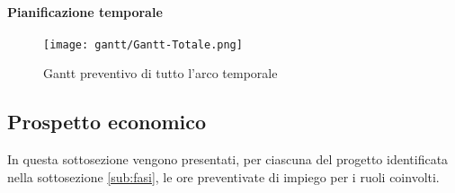 \documentclass{scalatekids-article}
\begin{document}
\newpage
\paragraph{Pianificazione temporale}
\begin{figure}[H]
  \texttt{[image: gantt/Gantt-Totale.png]}
  \caption{Gantt preventivo di tutto l'arco temporale}
\end{figure}

\newpage
\subsection{Prospetto economico}
In questa sottosezione vengono presentati, per ciascuna  del progetto identificata
nella sottosezione \ref{sub:fasi}, le ore preventivate di impiego per i ruoli coinvolti.
\end{document}

